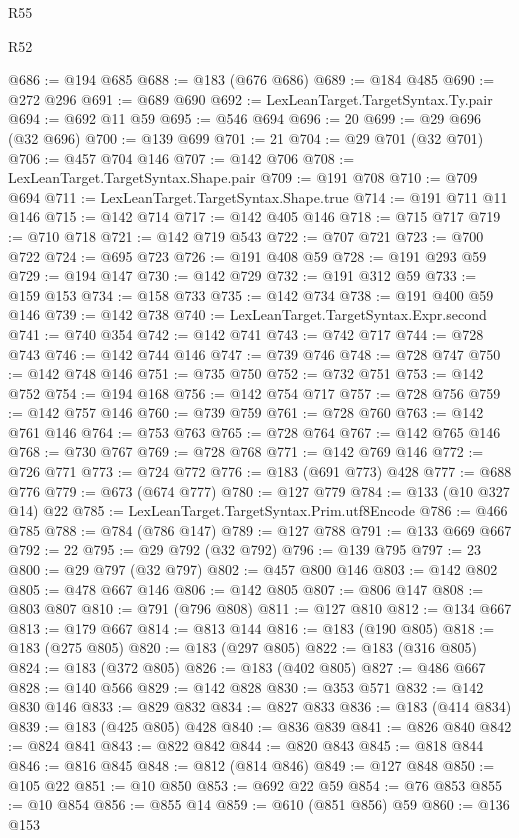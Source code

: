 \begin{lexlean}{R55}
\begin{lexlean}{R52}
\begin{coremodule}
{{{{{{{{{{{{{{{{{{{{{{{{{{{{{{{{{{{{{{{{{{{{{{{{{{{{{{{{{{{{{{{{{{{{{{{{{{{{{{{{{{{{{{{{{{{{{{{{{{{{{{{{{{{{{{{{{{{{{{{{{{{{{{{{{{{{{{{{{{{{{{{{{{{{{{{{{{{{{{{{{{{{{{{{{{{{{{{{{{{{{{{{{{{{{{{{{{{{{{@686 := @194 @685
@688 := @183 (@676 @686)
@689 := @184 @485
@690 := @272 @296
@691 := @689 @690
@692 := LexLeanTarget.TargetSyntax.Ty.pair
@694 := @692 @11 @59
@695 := @546 @694
@696 := 20
@699 := @29 @696 (@32 @696)
@700 := @139 @699
@701 := 21
@704 := @29 @701 (@32 @701)
@706 := @457 @704 @146
@707 := @142 @706
@708 := LexLeanTarget.TargetSyntax.Shape.pair
@709 := @191 @708
@710 := @709 @694
@711 := LexLeanTarget.TargetSyntax.Shape.true
@714 := @191 @711 @11 @146
@715 := @142 @714
@717 := @142 @405 @146
@718 := @715 @717
@719 := @710 @718
@721 := @142 @719 @543
@722 := @707 @721
@723 := @700 @722
@724 := @695 @723
@726 := @191 @408 @59
@728 := @191 @293 @59
@729 := @194 @147
@730 := @142 @729
@732 := @191 @312 @59
@733 := @159 @153
@734 := @158 @733
@735 := @142 @734
@738 := @191 @400 @59 @146
@739 := @142 @738
@740 := LexLeanTarget.TargetSyntax.Expr.second
@741 := @740 @354
@742 := @142 @741
@743 := @742 @717
@744 := @728 @743
@746 := @142 @744 @146
@747 := @739 @746
@748 := @728 @747
@750 := @142 @748 @146
@751 := @735 @750
@752 := @732 @751
@753 := @142 @752
@754 := @194 @168
@756 := @142 @754 @717
@757 := @728 @756
@759 := @142 @757 @146
@760 := @739 @759
@761 := @728 @760
@763 := @142 @761 @146
@764 := @753 @763
@765 := @728 @764
@767 := @142 @765 @146
@768 := @730 @767
@769 := @728 @768
@771 := @142 @769 @146
@772 := @726 @771
@773 := @724 @772
@776 := @183 (@691 @773) @428
@777 := @688 @776
@779 := @673 (@674 @777)
@780 := @127 @779
@784 := @133 (@10 @327 @14) @22
@785 := LexLeanTarget.TargetSyntax.Prim.utf8Encode
@786 := @466 @785
@788 := @784 (@786 @147)
@789 := @127 @788
@791 := @133 @669 @667
@792 := 22
@795 := @29 @792 (@32 @792)
@796 := @139 @795
@797 := 23
@800 := @29 @797 (@32 @797)
@802 := @457 @800 @146
@803 := @142 @802
@805 := @478 @667 @146
@806 := @142 @805
@807 := @806 @147
@808 := @803 @807
@810 := @791 (@796 @808)
@811 := @127 @810
@812 := @134 @667
@813 := @179 @667
@814 := @813 @144
@816 := @183 (@190 @805)
@818 := @183 (@275 @805)
@820 := @183 (@297 @805)
@822 := @183 (@316 @805)
@824 := @183 (@372 @805)
@826 := @183 (@402 @805)
@827 := @486 @667
@828 := @140 @566
@829 := @142 @828
@830 := @353 @571
@832 := @142 @830 @146
@833 := @829 @832
@834 := @827 @833
@836 := @183 (@414 @834)
@839 := @183 (@425 @805) @428
@840 := @836 @839
@841 := @826 @840
@842 := @824 @841
@843 := @822 @842
@844 := @820 @843
@845 := @818 @844
@846 := @816 @845
@848 := @812 (@814 @846)
@849 := @127 @848
@850 := @105 @22
@851 := @10 @850
@853 := @692 @22 @59
@854 := @76 @853
@855 := @10 @854
@856 := @855 @14
@859 := @610 (@851 @856) @59
@860 := @136 @153
}}}}}}}}}}}}}}}}}}}}}}}}}}}}}}}}}}}}}}}}}}}}}}}}}}}}}}}}}}}}}}}}}}}}}}}}}}}}}}}}}}}}}}}}}}}}}}}}}}}}}}}}}}}}}}}}}}}}}}}}}}}}}}}}}}}}}}}}}}}}}}}}}}}}}}}}}}}}}}}}}}}}}}}}}}}}}}}}}}}}}}}}}}}}}}}}}}}}}}
\end{coremodule}
\end{lexlean}
\end{lexlean}
